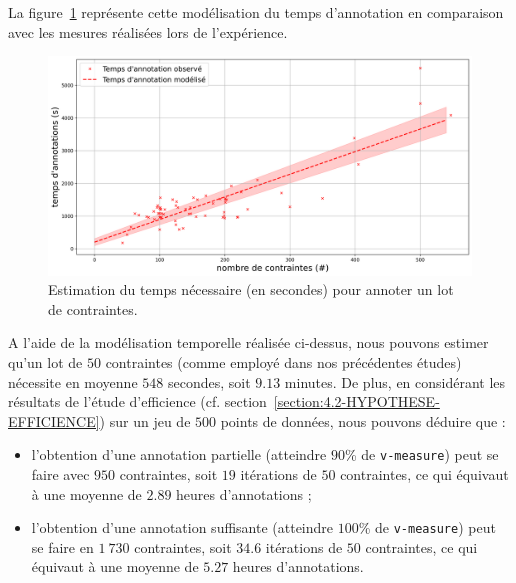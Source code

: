 			La figure~\ref{figure:4.3.1-ETUDE-COUTS-TEMPS-ANNOTATION-SIMULATION} représente cette modélisation du temps d'annotation en comparaison avec les mesures réalisées lors de l'expérience.
			\begin{figure}[!htb]
				\centering
				\includegraphics[width=\textwidth]{figures/etude-temps-annotation-1-modelisation-temps}
				\caption{Estimation du temps nécessaire (en secondes) pour annoter un lot de contraintes.}
				\label{figure:4.3.1-ETUDE-COUTS-TEMPS-ANNOTATION-SIMULATION}
			\end{figure}
		
			A l'aide de la modélisation temporelle réalisée ci-dessus, nous pouvons estimer qu'un lot de $50$ contraintes (comme employé dans nos précédentes études) nécessite en moyenne $548$ secondes, soit $9.13$ minutes.
			De plus, en considérant les résultats de l'étude d'efficience (cf. section~\ref{section:4.2-HYPOTHESE-EFFICIENCE}) sur un jeu de $500$ points de données, nous pouvons déduire que :
			\begin{itemize}
				\item l'obtention d'une annotation partielle (atteindre $90$\% de \texttt{v-measure}) peut se faire avec $950$ contraintes, soit $19$ itérations de $50$ contraintes, ce qui équivaut à une moyenne de $2.89$ heures d'annotations ;
				\item l'obtention d'une annotation suffisante (atteindre $100$\% de \texttt{v-measure}) peut se faire en $1~730$ contraintes, soit $34.6$ itérations de $50$ contraintes, ce qui équivaut à une moyenne de $5.27$ heures d'annotations.
			\end{itemize}
		
